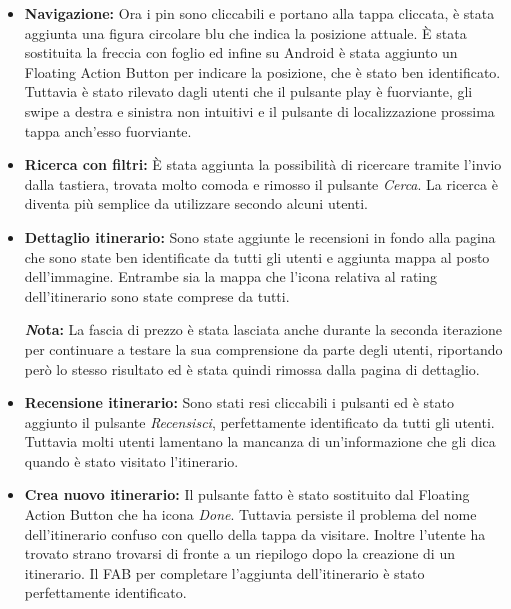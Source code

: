 \begin{itemize}

\item \textbf{Navigazione:} Ora i pin sono cliccabili e portano alla tappa cliccata, è stata aggiunta una figura circolare blu che indica la posizione attuale. È stata sostituita la freccia con foglio ed infine su Android è stata aggiunto un Floating Action Button per indicare la posizione, che è stato ben identificato. Tuttavia è stato rilevato dagli utenti che il pulsante play è fuorviante, gli swipe a destra e sinistra non intuitivi e il pulsante di localizzazione prossima tappa anch'esso fuorviante.

\item \textbf{Ricerca con filtri:} È stata aggiunta la possibilità di ricercare tramite l’invio dalla tastiera, trovata molto comoda e rimosso il pulsante \emph{Cerca}. La ricerca è diventa più semplice da utilizzare secondo alcuni utenti.

\item \textbf{Dettaglio itinerario:} Sono state aggiunte le recensioni in fondo alla pagina che sono state ben identificate da tutti gli utenti e aggiunta mappa al posto dell’immagine. Entrambe sia la mappa che l'icona relativa al rating dell'itinerario sono state comprese da tutti.

\textbf{\emph Nota:} La fascia di prezzo è stata lasciata anche durante la seconda iterazione per continuare a testare la sua comprensione da parte degli utenti, riportando però lo stesso risultato ed è stata quindi rimossa dalla pagina di dettaglio.

\item \textbf{Recensione itinerario:} Sono stati resi cliccabili i pulsanti ed è stato aggiunto il pulsante \emph{Recensisci}, perfettamente identificato da tutti gli utenti. Tuttavia molti utenti lamentano la mancanza di un'informazione che gli dica quando è stato visitato l'itinerario.

\item \textbf{Crea nuovo itinerario:} Il pulsante fatto è stato sostituito dal Floating Action Button che ha icona \emph{Done}. Tuttavia persiste il problema del nome dell’itinerario confuso con quello della tappa da visitare. Inoltre l'utente ha trovato strano trovarsi di fronte a un riepilogo dopo la creazione di un itinerario. Il FAB per completare l'aggiunta dell'itinerario è stato perfettamente identificato.

\end{itemize}

